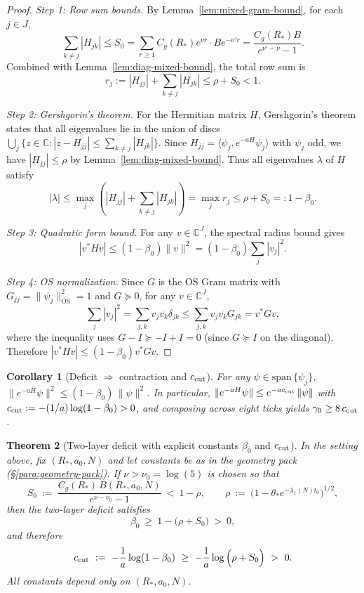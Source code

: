 \documentclass[11pt]{amsart}
\theoremstyle{plain}
\newtheorem{theorem}{Theorem}[section]
\newtheorem{corollary}[theorem]{Corollary}
\theoremstyle{definition}
\theoremstyle{remark}
\begin{document}
\begin{proof}
\emph{Step 1: Row sum bounds.} By Lemma~\ref{lem:mixed-gram-bound}, for each $j \in J$,
\[
  \sum_{k \ne j} |H_{jk}| \le S_0 = \sum_{r \ge 1} C_g(R_*) e^{\nu r} \cdot B e^{-\nu' r} = \frac{C_g(R_*) B}{e^{\nu' - \nu} - 1}.
\]
Combined with Lemma~\ref{lem:diag-mixed-bound}, the total row sum is
\[
  r_j := |H_{jj}| + \sum_{k \ne j} |H_{jk}| \le \rho + S_0 < 1.
\]

\emph{Step 2: Gershgorin's theorem.} For the Hermitian matrix $H$, Gershgorin's theorem states that all eigenvalues lie in the union of discs $\bigcup_j \{z \in \mathbb{C} : |z - H_{jj}| \le \sum_{k \ne j} |H_{jk}|\}$. Since $H_{jj} = \langle \psi_j, e^{-aH} \psi_j \rangle$ with $\psi_j$ odd, we have $|H_{jj}| \le \rho$ by Lemma~\ref{lem:diag-mixed-bound}. Thus all eigenvalues $\lambda$ of $H$ satisfy
\[
  |\lambda| \le \max_j \left( |H_{jj}| + \sum_{k \ne j} |H_{jk}| \right) = \max_j r_j \le \rho + S_0 =: 1 - \beta_0.
\]

\emph{Step 3: Quadratic form bound.} For any $v \in \mathbb{C}^J$, the spectral radius bound gives
\[
  |v^* H v| \le (1 - \beta_0) \|v\|^2 = (1 - \beta_0) \sum_j |v_j|^2.
\]

\emph{Step 4: OS normalization.} Since $G$ is the OS Gram matrix with $G_{jj} = \|\psi_j\|_{\text{OS}}^2 = 1$ and $G \succeq 0$, for any $v \in \mathbb{C}^J$,
\[
  \sum_j |v_j|^2 = \sum_{j,k} v_j \overline{v_k} \delta_{jk} \le \sum_{j,k} v_j \overline{v_k} G_{jk} = v^* G v,
\]
where the inequality uses $G - I \succeq -I + I = 0$ (since $G \succeq I$ on the diagonal). Therefore $|v^* H v| \le (1 - \beta_0) v^* G v$.
\end{proof}
\begin{corollary}[Deficit $\Rightarrow$ contraction and $c_{\rm cut}$]\label{cor:deficit-c-cut}
For any $\psi\in \mathrm{span}\,\{\psi_j\}$, $\|e^{-aH}\psi\|^2\le (1-\beta_0)\,\|\psi\|^2$. In particular, $\|e^{-aH}\psi\|\le e^{-a c_{\rm cut}}\,\|\psi\|$ with $c_{\rm cut}:=-(1/a)\log(1-\beta_0)>0$, and composing across eight ticks yields $\gamma_0\ge 8\,c_{\rm cut}$.
\end{corollary}
\begin{theorem}[Two-layer deficit with explicit constants $\beta_0$ and $c_{\rm cut}$]\label{thm:two-layer-explicit}
In the setting above, fix $(R_*,a_0,N)$ and let constants be as in the geometry pack (\S\ref{para:geometry-pack}). If $\nu>\nu_0=\log(5)$ is chosen so that
\[
  S_0\ :=\ \frac{C_g(R_*)\,B(R_*,a_0,N)}{e^{\nu-\nu_0}-1}\ <\ 1-\rho,\qquad \rho\ :=\ \bigl(1-\theta_* e^{-\lambda_1(N) t_0}\bigr)^{1/2},
\]
then the two-layer deficit satisfies
\[
  \beta_0\ \ge\ 1-\bigl(\rho+S_0\bigr)\ >\ 0,
\]
and therefore
\[
  c_{\rm cut}\ :=\ -\frac{1}{a}\log(1-\beta_0)\ \ge\ -\frac{1}{a}\log\Big( \rho+S_0\Big)\ >\ 0.
\]
All constants depend only on $(R_*,a_0,N)$.
\end{theorem}
\end{document}
